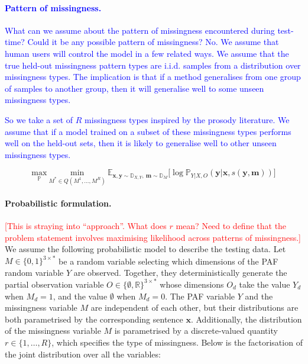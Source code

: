 \documentclass[a4paper,12pt,twoside,openright]{article}
\newcommand{\crit}[1]{\textcolor{red}{#1}}
\newcommand{\draft}[1]{\textcolor{blue}{#1}}
\begin{document}
\draft{\paragraph{Pattern of missingness.} What can we assume about the pattern of missingness encountered during test-time? Could it be any possible pattern of missingness? No. We assume that human users will control the model in a few related ways. We assume that the true held-out missingness pattern types are i.i.d. samples from a distribution over missingness types. The implication is that if a method generalises from one group of samples to another group, then it will generalise well to some unseen missingness types.}

\draft{So we take a set of $R$ missingness types inspired by the prosody literature. We assume that if a model trained on a subset of these missingness types performs well on the held-out sets, then it is likely to generalise well to other unseen missingness types.}

\[
    \underset{\mathbb{P}}{\mathrm{max}} ~ \underset{M^* \in Q(M^1, \dots, M^R)}{\mathrm{min}} ~ \mathbb{E}_{\mathbf{x}, \mathbf{y} \sim \mathbb{D}_{X,Y}, ~ \mathbf{m} \sim \mathbb{D}_{M}} \bigl[ \log \mathbb{P}_{Y | X, O} (\mathbf{y} | \mathbf{x}, s(\mathbf{y}, \mathbf{m})) \bigr]
\]

\paragraph{Probabilistic formulation.} \crit{[This is straying into ``approach''. What does $r$ mean? Need to define that the problem statement involves maximising likelihood across patterns of missingness.]} We assume the following probabilistic model to describe the testing data. Let $M \in \{0,1\}^{3 \times *}$ be a random variable selecting which dimensions of the PAF random variable $Y$ are observed. Together, they deterministically generate the partial observation variable $O \in \{\emptyset, \mathbb{R}\}^{3 \times *}$ whose dimensions $O_d$ take the value $Y_d$ when $M_d = 1$, and the value $\emptyset$ when $M_d = 0$. The PAF variable $Y$ and the missingness variable $M$ are independent of each other, but their distributions are both parametrised by the corresponding sentence $\mathbf{x}$. Additionally, the distribution of the missingness variable $M$ is parametrised by a discrete-valued quantity $r \in \{1, \dots, R\}$, which specifies the type of missingness. Below is the factorisation of the joint distribution over all the variables:
\end{document}
